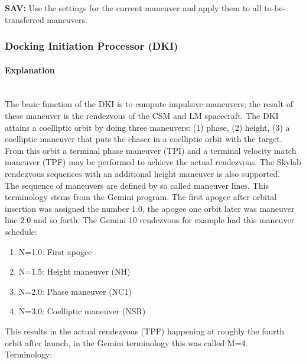 \documentclass[11pt]{article} %
\begin{document}
\textbf{SAV:} Use the settings for the current maneuver and apply them to all to-be-transferred maneuvers.\\
\newpage

\subsubsection{Docking Initiation Processor (DKI)}

\paragraph{Explanation}\mbox{} \\

The basic function of the DKI is to compute impulsive maneuvers; the result of these maneuver is the rendezvous of the CSM and LM spacecraft. The DKI attains a coelliptic orbit by doing three maneuvers: (1) phase, (2) height, (3) a coelliptic maneuver that puts the chaser in a coelliptic orbit with the target. From this orbit a terminal phase maneuver (TPI) and a terminal velocity match maneuver (TPF) may be performed to achieve the actual rendezvous. The Skylab rendezvous sequences with an additional height maneuver is also supported.\\

The sequence of maneuvers are defined by so called maneuver lines. This terminology stems from the Gemini program. The first apogee after orbital insertion was assigned the number 1.0, the apogee one orbit later was maneuver line 2.0 and so forth. The Gemini 10 rendezvous for example had this maneuver schedule:

\begin{enumerate}
\item N=1.0: First apogee
\item N=1.5: Height maneuver (NH)
\item N=2.0: Phase maneuver (NC1)
\item N=3.0: Coelliptic maneuver (NSR)
\end{enumerate}

This results in the actual rendezvous (TPF) happening at roughly the fourth orbit after launch, in the Gemini terminology this was called M=4.\\

Terminology:\\
\end{document}
